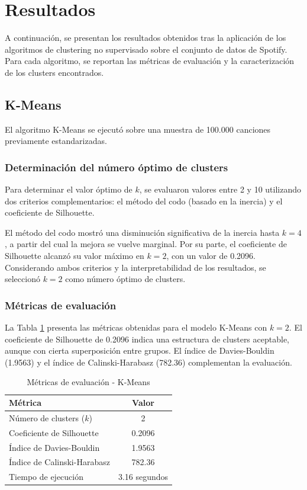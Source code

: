 \section{Resultados}

A continuación, se presentan los resultados obtenidos tras la aplicación de los algoritmos de clustering no supervisado sobre el conjunto de datos de Spotify. Para cada algoritmo, se reportan las métricas de evaluación y la caracterización de los clusters encontrados.

\subsection{K-Means}

El algoritmo K-Means se ejecutó sobre una muestra de 100.000 canciones previamente estandarizadas.

\subsubsection{Determinación del número óptimo de clusters}

Para determinar el valor óptimo de \(k\), se evaluaron valores entre 2 y 10 utilizando dos criterios complementarios: el método del codo (basado en la inercia) y el coeficiente de Silhouette.

El método del codo mostró una disminución significativa de la inercia hasta \(k = 4\), a partir del cual la mejora se vuelve marginal. Por su parte, el coeficiente de Silhouette alcanzó su valor máximo en \(k = 2\), con un valor de 0.2096. Considerando ambos criterios y la interpretabilidad de los resultados, se seleccionó \(k = 2\) como número óptimo de clusters.

\subsubsection{Métricas de evaluación}

La Tabla \ref{tab:metricas_kmeans} presenta las métricas obtenidas para el modelo K-Means con \(k = 2\). El coeficiente de Silhouette de 0.2096 indica una estructura de clusters aceptable, aunque con cierta superposición entre grupos. El índice de Davies-Bouldin (1.9563) y el índice de Calinski-Harabasz (782.36) complementan la evaluación.

\begin{table}[htbp]
\caption{Métricas de evaluación - K-Means}
\centering
\small
\begin{tabular}{|l|c|}
\hline
\textbf{Métrica} & \textbf{Valor} \\
\hline
Número de clusters (\(k\)) & 2 \\
Coeficiente de Silhouette & 0.2096 \\
Índice de Davies-Bouldin & 1.9563 \\
Índice de Calinski-Harabasz & 782.36 \\
Tiempo de ejecución & 3.16 segundos \\
\hline
\end{tabular}
\label{tab:metricas_kmeans}
\end{table}

